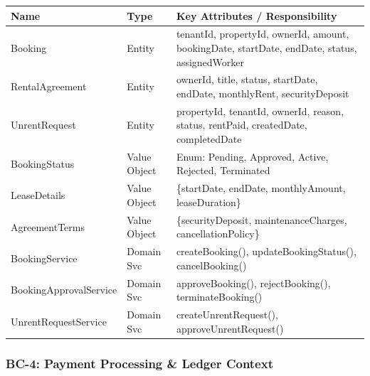 \documentclass[12pt,a4paper]{article}
\begin{document}
\begin{center}
\begin{tabular}{@{}p{3.5cm}p{2cm}p{8.5cm}@{}}
\toprule
\textbf{Name} & \textbf{Type} & \textbf{Key Attributes / Responsibility} \\
\midrule
Booking & Entity & tenantId, propertyId, ownerId, amount, bookingDate, startDate, endDate, status, assignedWorker \\
RentalAgreement & Entity & ownerId, title, status, startDate, endDate, monthlyRent, securityDeposit \\
UnrentRequest & Entity & propertyId, tenantId, ownerId, reason, status, rentPaid, createdDate, completedDate \\
BookingStatus & Value Object & Enum: Pending, Approved, Active, Rejected, Terminated \\
LeaseDetails & Value Object & \{startDate, endDate, monthlyAmount, leaseDuration\} \\
AgreementTerms & Value Object & \{securityDeposit, maintenanceCharges, cancellationPolicy\} \\
BookingService & Domain Svc & createBooking(), updateBookingStatus(), cancelBooking() \\
BookingApprovalService & Domain Svc & approveBooking(), rejectBooking(), terminateBooking() \\
UnrentRequestService & Domain Svc & createUnrentRequest(), approveUnrentRequest() \\
\bottomrule
\end{tabular}
\end{center}

\subsubsection{BC-4: Payment Processing \& Ledger Context}
\end{document}

